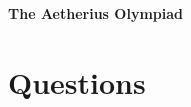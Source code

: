 \documentclass{exam}
\begin{document}
\begin{center}
	\LARGE{\textbf{The Aetherius Olympiad}}

	\vspace{8pt}

	\large{}
\end{center}

\section*{Questions}

\begin{questions}
	\question[7]{
	}
\end{questions}
\end{document}
